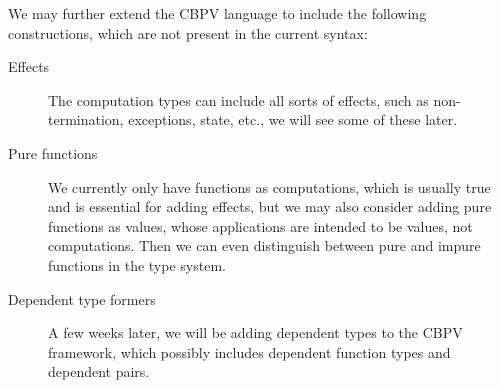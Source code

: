 \documentclass[letterpaper]{article}
\begin{document}
We may further extend the CBPV language to include the following constructions,
which are not present in the current syntax:

\begin{description}
  \item[Effects] The computation types can include all sorts of effects,
    such as non-termination, exceptions, state, etc., we will see some of these later.
  \item[Pure functions] We currently only have functions as computations,
    which is usually true and is essential for adding effects,
    but we may also consider adding pure functions as values,
    whose applications are intended to be values, not computations.
    Then we can even distinguish between pure and impure functions in the type system.
  \item[Dependent type formers] A few weeks later, we will be adding dependent types
    to the CBPV framework, which possibly includes dependent function types and dependent pairs.
\end{description}
\end{document}
